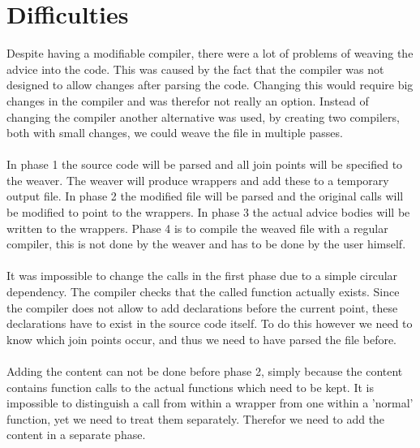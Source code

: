\documentclass[a4paper]{report}
\begin{document}
\section{Difficulties}
Despite having a modifiable compiler, there were a lot of problems of weaving the advice into the code. This was caused by the fact that the compiler was not designed to allow changes after parsing the code. Changing this would require big changes in the compiler and was therefor not really an option. Instead of changing the compiler another alternative was used, by creating two compilers, both with small changes, we could weave the file in multiple passes.\\
\\
In phase 1 the source code will be parsed and all join points will be specified to the weaver. The weaver will produce wrappers and add these to a temporary output file. In phase 2 the modified file will be parsed and the original calls will be modified to point to the wrappers. In phase 3 the actual advice bodies will be written to the wrappers. Phase 4 is to compile the weaved file with a regular compiler, this is not done by the weaver and has to be done by the user himself.\\
\\
It was impossible to change the calls in the first phase due to a simple circular dependency. The compiler checks that the called function actually exists. Since the compiler does not allow to add declarations before the current point, these declarations have to exist in the source code itself. To do this however we need to know which join points occur, and thus we need to have parsed the file before.\\
\\
Adding the content can not be done before phase 2, simply because the content contains function calls to the actual functions which need to be kept. It is impossible to distinguish a call from within a wrapper from one within a 'normal' function, yet we need to treat them separately. Therefor we need to add the content in a separate phase.
\end{document}
